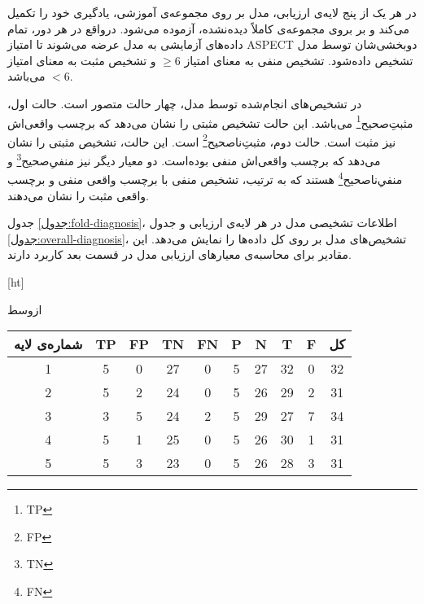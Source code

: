 در هر یک از پنج لایه‌ی ارزیابی، مدل بر روی مجموعه‌ی آموزشی، یادگیری خود را تکمیل می‌کند و بر بروی
 مجموعه‌ی کاملاً دیده‌نشده، آزموده می‌شود.
 درواقع در هر دور، تمام داده‌های آزمایشی به مدل عرضه می‌شوند تا امتیاز ASPECT دو‌بخشی‌شان توسط مدل تشخیص داده‌شود.
تشخیص منفی به معنای امتیاز $\geq 6$ و تشخیص مثبت به معنای امتیاز $<6$ می‌باشد.

در تشخیص‌های انجام‌شده توسط مدل، چهار حالت متصور است.
حالت اول، 
مثبتِ‌صحیح\footnote{TP}
می‌باشد.
این حالت تشخیص مثبتی را نشان می‌دهد که برچسب واقعی‌اش نیز مثبت است.
حالت دوم، 
مثبتِ‌ناصحیح\footnote{FP}
است.
این حالت، تشخیص مثبتی را نشان می‌دهد که برچسب واقعی‌اش منفی بوده‌است.
دو معیار دیگر نیز 
منفیِ‌صحیح\footnote{TN}
و منفیِ‌ناصحیح\footnote{FN}
هستند که به ترتیب، تشخیص منفی با برچسب واقعی منفی و برچسب واقعی مثبت را نشان می‌دهند.

جدول \ref{جدول:fold-diagnosis}، اطلاعات تشخیصی مدل در
هر لایه‌ی ارزیابی و جدول \ref{جدول:overall-diagnosis}،
تشخیص‌های مدل بر روی کل داده‌ها را نمایش می‌دهد.
این مقادیر برای محاسبه‌ی معیار‌های ارزیابی مدل در قسمت بعد کاربرد دارند.

[ht]

\vspace{1.5em}

‌ازوسط

\begin{tabular}{cccccccccc}
    \hline
     
    شماره‌ی لایه & TP & FP & TN & FN & P & N  & T  & F & کل\\ \hline
    1           & 5  & 0  & 27 & 0  & 5 & 27 & 32 & 0 & 32 \\ 
    2           & 5  & 2  & 24 & 0  & 5 & 26 & 29 & 2 & 31\\ 
    3           & 3  & 5  & 24 & 2  & 5 & 29 & 27 & 7 & 34\\ 
    4           & 5  & 1  & 25 & 0  & 5 & 26 & 30 & 1 & 31\\ 
    5           & 5  & 3  & 23 & 0  & 5 & 26 & 28 & 3 & 31\\ \hline
    \end{tabular}


